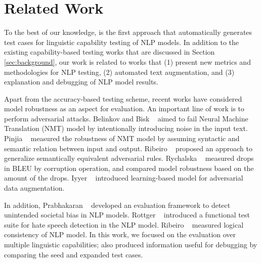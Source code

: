 \vspace{-6pt}
\section{Related Work}

To the best of our knowledge, \tool is the first approach that automatically generates test cases for linguistic capability testing of NLP models. In addition to the existing capability-based testing works that are discussed in Section \ref{sec:background}, our work is related to works that (1) present new metrics and methodologies for NLP testing, (2) automated text augmentation, and (3) explanation and debugging of NLP model results.

%
Apart from the accuracy-based testing
scheme, recent works have considered model robustness as an
aspect for evaluation.
An important line of work is to perform adversarial attacks.
Belinkov and Bisk
\textit{\etal}~\cite{belinkov2018breaknmt} aimed to fail Neural Machine
Translation (NMT) model by intentionally introducing noise in the input
text. Pinjia
\textit{\etal}~\cite{pinjia2020structinvtestingnmt,pinjia2020testnmtrt}
measured the robustness of NMT model by assuming syntactic and semantic relation between input and output. Ribeiro
\textit{\etal}~\cite{ribeiro2018sear} proposed an approach to
generalize semantically equivalent adversarial rules. Rychalska \textit{\etal}~\cite{rychalska2019wildnlp} measured drops in
BLEU by corruption operation, and compared model robustness
based on the amount of the drops. Iyyer
\textit{\etal}~\cite{iyyer2018adversarial} introduced learning-based
model for adversarial data augmentation.

In addition, Prabhakaran
\textit{\etal}~\cite{prabhakaran2019fairness} developed an evaluation
framework to detect unintended societal bias in NLP models. Rottger
\textit{\etal}~\cite{rottger2020hatecheck} introduced a functional
test suite for hate speech detection in the NLP model.  Ribeiro
\textit{\etal}~\cite{ribeiro2019consistencyeval} measured logical
consistency of NLP model. In this work, we focused on the evaluation over 
multiple linguistic capabilities; \tool also produced information useful for debugging by comparing the seed and expanded test cases.

